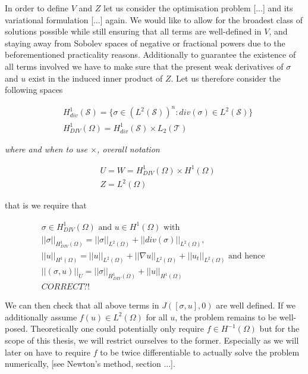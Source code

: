\documentclass[../draft_1.tex]{subfiles}
\begin{document}
In order to define $V$ and $Z$ let us consider the optimisation problem [...] and its variational formulation [...] again. We would like to allow for the broadest class of solutions possible while still ensuring that all terms are well-defined in $V$, and staying away from Sobolev spaces of negative or fractional powers due to the beforementioned practicality reasons. Additionally to guarantee the existence of all terms involved we have to make sure that the present weak derivatives of $\sigma$ and $u$ exist in the induced inner product of $Z$. Let us therefore consider the following spaces 
\begin{ceqn}
	\begin{align}
	&H_{div}^1(\mathcal{S}) = \{\sigma \in (L^2(\mathcal{S}))^n : div (\sigma) \in L^2(\mathcal{S})\} \\
    &H_{DIV}^1(\Omega) = H_{div}^1(\mathcal{S}) \times L_2(\mathcal{T}) 
    	\end{align}
\end{ceqn}
\textit{where and when to use $\times$, overall notation}
\begin{ceqn}
	\begin{align}
    & U = W = H_{DIV}^1(\Omega) \times H^1(\Omega) \\
    & Z = L^2(\Omega)
	\end{align}
\end{ceqn}
that is we require that 
\begin{ceqn}
	\begin{align}
	\label{spacesLS}
\sigma \in H_{DIV}^1(\Omega) \text{  and  } u \in H^1(\Omega) \text { with } \\
|| \sigma ||_{H_{DIV}^1(\Omega)} = || \sigma ||_{L^2(\Omega)} + || div(\sigma) ||_{L^2(\Omega)}, \\
 ||u ||_{H^1(\Omega)} = || u ||_{L^2(\Omega)} + || \nabla u ||_{L^2(\Omega)} + || u_t ||_{L^2(\Omega)} \text{ and hence } \\
 || (\sigma, u) ||_U = || \sigma ||_{H_{DIV}^1(\Omega)} + || u ||_{H^1(\Omega)} \\
 CORRECT ?!
	\end{align}
\end{ceqn}
We can then check that all above terms in $J([\sigma, u], 0)$ are well defined. If we additionally assume $f(u) \in L^2(\Omega)$ for all $u$, the problem remains to be well-posed. Theoretically one could potentially only require $f \in H^{-1}(\Omega)$ but for the scope of this thesis, we will restrict ourselves to the former. Especially as we will later on have to require $f$ to be twice differentiable to actually solve the problem numerically, [see Newton's method, section ...].\\
\end{document}
